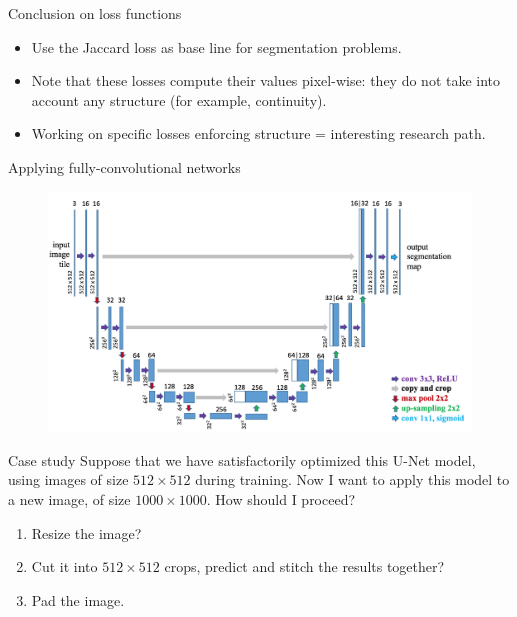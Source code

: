 \documentclass[xcolor=pdftex,dvipsnames,table,mathserif]{beamer}
\begin{document}
\begin{frame}{Conclusion on loss functions}

  \begin{itemize}
  \item Use the Jaccard loss as base line for segmentation problems.
  \item Note that these losses compute their values pixel-wise: they do not take into account any structure (for example, continuity).
  \item Working on specific losses enforcing structure = interesting research path.
  \end{itemize}
\end{frame}


\begin{frame}{Applying fully-convolutional networks}

\begin{figure}[ht]
  \centering
  \includegraphics[height=0.30\textheight]{unet_lo}
\end{figure}


\begin{quizzblock}{Case study}
Suppose that we have satisfactorily optimized this U-Net model, using images of size $512 \times 512$ during training. Now I want to apply this model to a new image, of size $1000 \times 1000$. How should I proceed?
\end{quizzblock}

\begin{enumerate}
\item Resize the image?
\item Cut it into $512 \times 512$ crops, predict and stitch the results together?
\item Pad the image.
\end{enumerate}

\end{frame}
\end{document}
